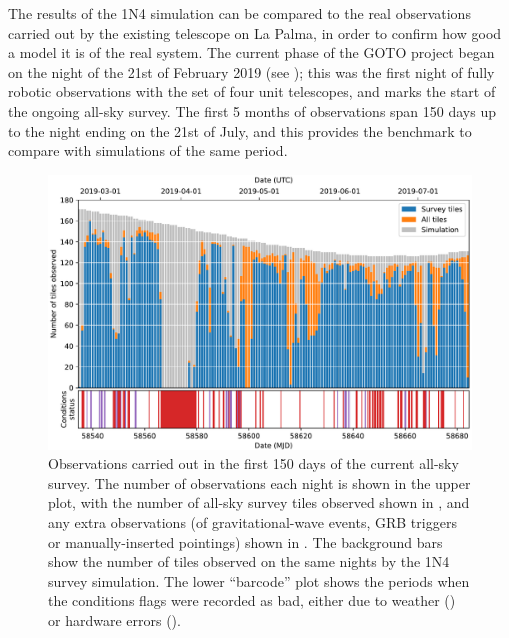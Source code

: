 \begin{colsection}

The results of the 1N4 simulation can be compared to the real observations carried out by the existing telescope on La Palma, in order to confirm how good a model it is of the real system. The current phase of the GOTO project began on the night of the 21st of February 2019 (see ); this was the first night of fully robotic observations with the set of four unit telescopes, and marks the start of the ongoing all-sky survey. The first 5 months of observations span 150 days up to the night ending on the 21st of July, and this provides the benchmark to compare with simulations of the same period.

\begin{figure}[p]
    \begin{center}
        \includegraphics[width=\linewidth]{images/150.pdf}
    \end{center}
    \caption[Observations carried out in the first 150 days of the all-sky survey]{
        Observations carried out in the first 150 days of the current all-sky survey. The number of observations each night is shown in the upper plot, with the number of all-sky survey tiles observed shown in , and any extra observations (of gravitational-wave events, GRB triggers or manually-inserted pointings) shown in . The background  bars show the number of tiles observed on the same nights by the 1N4 survey simulation. The lower ``barcode'' plot shows the periods when the conditions flags were recorded as bad, either due to weather () or hardware errors ().
    }\label{fig:150}
\end{figure}


\end{colsection}
